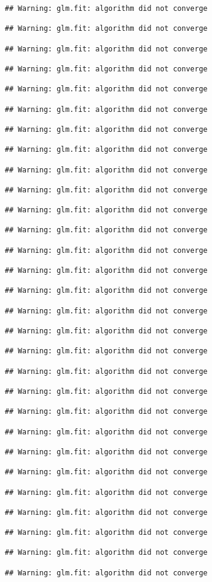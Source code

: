 \documentclass[
]{article}
\begin{document}
\begin{verbatim}
## Warning: glm.fit: algorithm did not converge

## Warning: glm.fit: algorithm did not converge

## Warning: glm.fit: algorithm did not converge

## Warning: glm.fit: algorithm did not converge

## Warning: glm.fit: algorithm did not converge

## Warning: glm.fit: algorithm did not converge

## Warning: glm.fit: algorithm did not converge

## Warning: glm.fit: algorithm did not converge

## Warning: glm.fit: algorithm did not converge

## Warning: glm.fit: algorithm did not converge

## Warning: glm.fit: algorithm did not converge

## Warning: glm.fit: algorithm did not converge

## Warning: glm.fit: algorithm did not converge

## Warning: glm.fit: algorithm did not converge

## Warning: glm.fit: algorithm did not converge

## Warning: glm.fit: algorithm did not converge

## Warning: glm.fit: algorithm did not converge

## Warning: glm.fit: algorithm did not converge

## Warning: glm.fit: algorithm did not converge

## Warning: glm.fit: algorithm did not converge

## Warning: glm.fit: algorithm did not converge

## Warning: glm.fit: algorithm did not converge

## Warning: glm.fit: algorithm did not converge

## Warning: glm.fit: algorithm did not converge

## Warning: glm.fit: algorithm did not converge

## Warning: glm.fit: algorithm did not converge

## Warning: glm.fit: algorithm did not converge

## Warning: glm.fit: algorithm did not converge

## Warning: glm.fit: algorithm did not converge


\end{verbatim}
\end{document}
